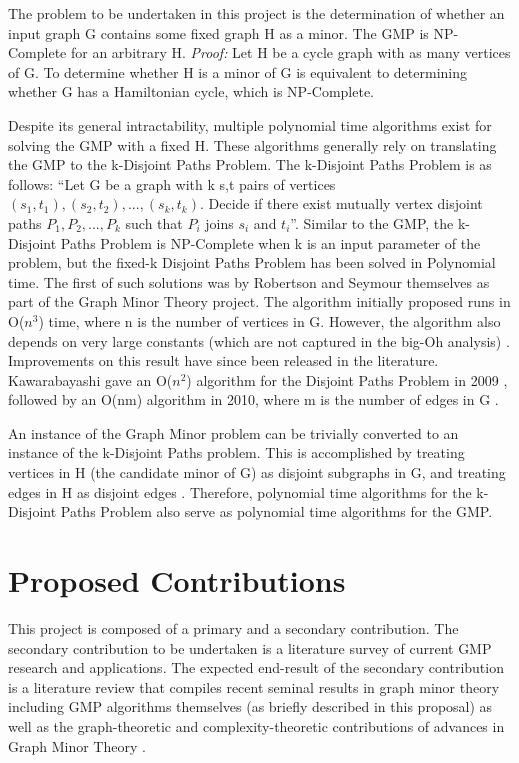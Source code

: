 \documentclass[12pt,conference]{IEEEtran}
\begin{document}
The problem to be undertaken in this project is the determination of whether an input graph G contains some fixed graph H as a minor. The GMP is NP-Complete for an arbitrary H. \textit{Proof:} Let H be a cycle graph with as many vertices of G. To determine whether H is a minor of G is equivalent to determining whether G has a Hamiltonian cycle, which is NP-Complete. 

Despite its general intractability, multiple polynomial time algorithms exist for solving the GMP with a fixed H. These algorithms generally rely on translating the GMP to the k-Disjoint Paths Problem. The k-Disjoint Paths Problem is as follows: ``Let G be a graph with k s,t pairs of vertices $(s_{1}, t_{1}), (s_{2}, t_{2}), ..., (s_{k}, t_{k})$. Decide if there exist mutually vertex disjoint paths $P_{1}, P_{2}, ..., P_{k}$ such that $P_{i}$ joins $s_{i}$ and $t_{i}$''. Similar to the GMP, the k-Disjoint Paths Problem is NP-Complete when k is an input parameter of the problem, but the fixed-k Disjoint Paths Problem has been solved in Polynomial time. The first of such solutions was by Robertson and Seymour \cite{robertson-seymour-13} \cite{robertson-seymour-13-proof} themselves as part of the Graph Minor Theory project. The algorithm initially proposed runs in O($n^{3}$) time, where n is the number of vertices in G. However, the algorithm also depends on very large constants (which are not captured in the big-Oh analysis) \cite{robertson-seymour-13}. Improvements on this result have since been released in the literature. Kawarabayashi gave an O($n^{2}$) algorithm for the Disjoint Paths Problem in 2009 \cite{kawarabayashi-n2}, followed by an O(nm) algorithm in 2010, where m is the number of edges in G \cite{kawarabayashi-nm}. 

An instance of the Graph Minor problem can be trivially converted to an instance of the k-Disjoint Paths problem. This is accomplished by treating vertices in H (the candidate minor of G) as disjoint subgraphs in G, and treating edges in H as disjoint edges \cite{sheppardson-thesis}. Therefore, polynomial time algorithms for the k-Disjoint Paths Problem also serve as polynomial time algorithms for the GMP. 

\section{Proposed Contributions}

This project is composed of a primary and a secondary contribution. The secondary contribution to be undertaken is a literature survey of current GMP research and applications. The expected end-result of the secondary contribution is a literature review that compiles recent seminal results in graph minor theory including GMP algorithms themselves (as briefly described in this proposal) as well as the graph-theoretic and complexity-theoretic contributions of advances in Graph Minor Theory \cite{parameterized-complexity}.
\end{document}
